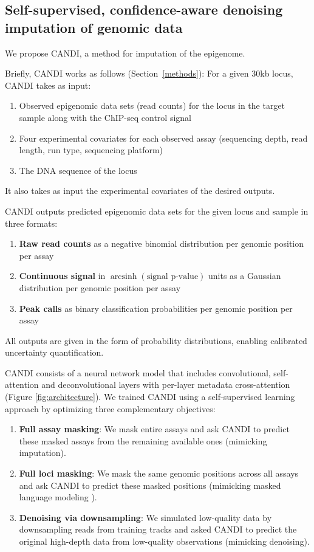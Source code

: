 
\subsection{Self-supervised, confidence-aware denoising imputation of genomic data}

We propose CANDI, a method for imputation of the epigenome.

Briefly, CANDI works as follows (Section~\ref{methods}): For a given 30kb locus, CANDI takes as input:
\begin{enumerate}
    \item Observed epigenomic data sets (read counts) for the locus in the target sample along with the ChIP-seq control signal
    \item Four experimental covariates for each observed assay (sequencing depth, read length, run type, sequencing platform)
    \item The DNA sequence of the locus
\end{enumerate}

It also takes as input the experimental covariates of the desired outputs.

CANDI outputs predicted epigenomic data sets for the given locus and sample in three formats:
\begin{enumerate}
    \item \textbf{Raw read counts} as a negative binomial distribution per genomic position per assay
    \item \textbf{Continuous signal} in $\operatorname{arcsinh}\left(\text{signal p-value}\right)$ units as a Gaussian distribution per genomic position per assay
    \item \textbf{Peak calls} as binary classification probabilities per genomic position per assay
\end{enumerate}


All outputs are given in the form of probability distributions, enabling calibrated uncertainty quantification.

CANDI consists of a neural network model that includes convolutional, self-attention and deconvolutional layers with per-layer metadata cross-attention (Figure \ref{fig:architecture}). We trained CANDI using a self-supervised learning approach by optimizing three complementary objectives:
\begin{enumerate}
    \item \textbf{Full assay masking}: We mask entire assays and ask CANDI to predict these masked assays from the remaining available ones (mimicking imputation).
    \item \textbf{Full loci masking}: We mask the same genomic positions across all assays and ask CANDI to predict these masked positions (mimicking masked language modeling \cite{ji2021dnabert, devlin2019bert}).
    \item \textbf{Denoising via downsampling}: We simulated low-quality data by downsampling reads from training tracks and asked CANDI to predict the original high-depth data from low-quality observations (mimicking denoising).
\end{enumerate}

